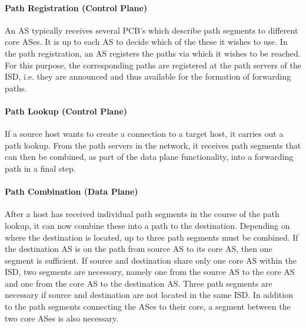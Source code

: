 \paragraph{Path Registration (Control Plane)}

An AS typically receives several PCB's which describe path segments to different core ASes. It is up to each AS to decide which of the these it wishes to use. In the path registration, an AS registers the paths via which it wishes to be reached. For this purpose, the corresponding paths are registered at the path servers of the ISD, i.e. they are announced and thus available for the formation of forwarding paths. 

\paragraph{Path Lookup (Control Plane)}

If a source host wants to create a connection to a target host, it carries out a path lookup. From the path servers in the network, it receives path segments that can then be combined, as part of the data plane functionality,  into a forwarding path in a final step. 

\paragraph{Path Combination (Data Plane)}

After a host has received individual path segments in the course of the path lookup, it can now combine these into a path to the destination. Depending on where the destination is located, up to three path segments must be combined. If the destination AS is on the path from source AS to its core AS, then one segment is sufficient. If source and destination share only one core AS within the ISD, two segments are necessary, namely one from the source AS to the core AS and one from the core AS to the destination AS. Three path segments are necessary if source and destination are not located in the same ISD. In addition to the path segments connecting the ASes to their core, a segment between the two core ASes is also necessary.


